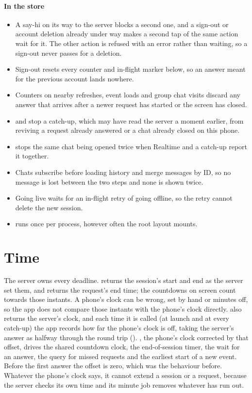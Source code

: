 \paragraph{In the store}
\begin{itemize}
  \item A say-hi on its way to the server blocks a second one, and a sign-out or account deletion
    already under way makes a second tap of the same action wait for it. The other action is refused
    with an error rather than waiting, so a sign-out never passes for a deletion.
  \item Sign-out resets every counter and in-flight marker below, so an answer meant for the previous
    account lands nowhere.
  \item Counters on nearby refreshes, event loads and group chat visits discard any answer that arrives
    after a newer request has started or the screen has closed.
  \item {} and  stop a catch-up, which may have read the server a
    moment earlier, from reviving a request already answered or a chat already closed on this phone.
  \item {} stops the same chat being opened twice when Realtime and a catch-up report it
    together.
  \item Chats subscribe before loading history and merge messages by ID, so no message is lost between
    the two steps and none is shown twice.
  \item Going live waits for an in-flight retry of going offline, so the retry cannot delete the new
    session.
  \item {} runs once per process, however often the root layout mounts.
\end{itemize}

\section{Time}
\label{sec:time}

The server owns every deadline.  returns the session's start and end as the server set
them, and  returns the request's end time; the countdowns on screen count towards those
instants. A phone's clock can be wrong, set by hand or minutes off, so the app does not compare those
instants with the phone's clock directly.  also returns the server's clock, and each time
it is called (at launch and at every catch-up) the app records how far the phone's clock is off, taking
the server's answer as halfway through the round trip ().
, the phone's clock corrected by that offset, drives the shared countdown clock, the
end-of-session timer, the wait for an answer, the query for missed requests and the earliest start of a
new event. Before the first answer the offset is zero, which was the behaviour before. Whatever the
phone's clock says, it cannot extend a session or a request, because the server checks its own time and
its minute job removes whatever has run out.


